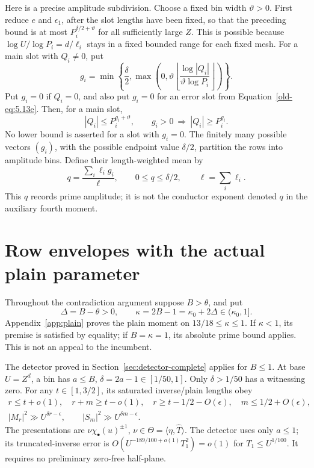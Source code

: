 \documentclass[12pt]{article}
\begin{document}
Here is a precise amplitude subdivision.  Choose a fixed bin width
\(\vartheta>0\).  First reduce \(e\) and \(\epsilon_1\), after the
slot lengths have been fixed, so that the preceding bound is at
most \(P_i^{\delta/2+\vartheta}\) for all sufficiently large \(Z\).
This is possible because
\(\log U/\log P_i=d/\ell_i\) stays in a fixed bounded range for
each fixed mesh.  For a main slot with \(Q_i\ne0\), put
\[
 g_i=\min\left\{\frac{\delta}{2},
   \max\left(0,\vartheta
     \left\lfloor\frac{\log|Q_i|}{\vartheta\log P_i}\right\rfloor
   \right)\right\}.
\]
Put \(g_i=0\) if \(Q_i=0\), and also put \(g_i=0\) for an error
slot from Equation~\eqref{old-eq:5.13e}.  Then, for a main slot,
\[
 |Q_i|\le P_i^{g_i+\vartheta},\qquad
 g_i>0\ \Longrightarrow\ |Q_i|\ge P_i^{g_i}.
\]
No lower bound is asserted for a slot with \(g_i=0\).
The finitely many possible vectors \((g_i)\), with the possible
endpoint value \(\delta/2\), partition the rows into amplitude
bins.  Define their length-weighted mean by
\begin{equation}
 q=\frac{\sum_i\ell_i g_i}{\ell},\qquad
 0\le q\le\delta/2,\qquad \ell=\sum_i\ell_i.
 \label{old-eq:6.6}
\end{equation}
This \(q\) records prime amplitude; it is not the conductor
exponent denoted \(q\) in the auxiliary fourth moment.

\section{Row envelopes with the actual plain parameter}\label{sec:counts}
Throughout the contradiction argument suppose \(B>\theta\), and put
\[
 \Delta=B-\theta>0,\qquad \kappa=2B-1=\kappa_0+2\Delta\in(\kappa_0,1].
\]
Appendix~\ref{app:plain} proves the plain moment on
\(13/18\le\kappa\le1\).  If \(\kappa<1\), its premise is
satisfied by equality; if \(B=\kappa=1\), its absolute prime
bound applies.  This is not an appeal to the incumbent.

The detector proved in Section~\ref{sec:detector-complete}
applies for \(B\le1\).  At base \(U=Z^d\), a bin has
\(a\le B\), \(\delta=2a-1\in[1/50,1]\).
Only \(\delta>1/50\) has a witnessing zero.
For any \(t\in[1,3/2]\), its saturated inverse/plain lengths obey
\[
\begin{gathered}
 r\le t+o(1),\quad r+m\ge t-o(1),\quad
 r\ge t-1/2-O(\epsilon),\quad m\le1/2+O(\epsilon),\\
 |M_r|^2\gg U^{\delta r-\epsilon},\qquad
 |S_m|^2\gg U^{\delta m-\epsilon}.
\end{gathered}
\]
The presentations are \(\nu\chi_\bullet(u)^{\pm1}\),
\(\nu\in\Theta=\langle\eta,\widehat T\rangle\).
The detector uses only \(a\le1\); its truncated-inverse error is
\(O(U^{-189/100+o(1)}T_1^2)=o(1)\) for \(T_1\le U^{1/100}\).
It requires no preliminary zero-free half-plane.
\end{document}
